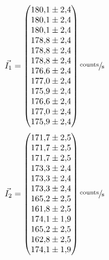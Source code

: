 \begin{equation}
	\vec{I_1}=
	\begin{pmatrix}
		\num{180.1 \pm 2.4} \\
		\num{180.1 \pm 2.4} \\
		\num{180.1\pm 2.4} \\
		\num{178.8\pm 2.4} \\
		\num{178.8\pm 2.4} \\
		\num{178.8\pm 2.4} \\
		\num{176.6\pm 2.4} \\
		\num{177.0\pm 2.4} \\
		\num{175.9\pm 2.4} \\
    \num{176.6\pm 2.4} \\
    \num{177.0\pm 2.4} \\
    \num{175.9\pm 2.4} \\
	\end{pmatrix}
    \sfrac{\text{counts}}{\text{s}}
	\label{eq:vecleer1}
\end{equation}
\begin{equation}
	\vec{I_2}=
	\begin{pmatrix}
		\num{171.7 \pm 2.5} \\
		\num{171.7 \pm 2.5} \\
		\num{171.7\pm 2.5} \\
		\num{173.3\pm 2.4} \\
		\num{173.3\pm 2.4} \\
		\num{173.3\pm 2.4} \\
		\num{165.2\pm 2.5} \\
		\num{161.8\pm 2.5} \\
		\num{174.1\pm 1.9} \\
    \num{165.2\pm 2.5} \\
    \num{162.8\pm 2.5} \\
    \num{174.1\pm 1.9} \\
	\end{pmatrix}
    \sfrac{\text{counts}}{\text{s}}
	\label{eq:vecleer2}
\end{equation}
